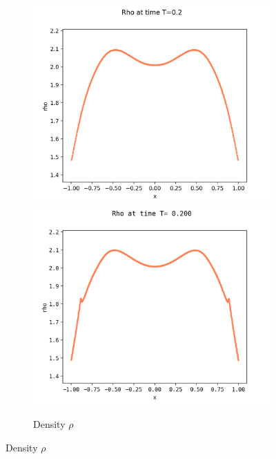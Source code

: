 \documentclass{article}
\numberwithin{equation}{section}
\newcommand{\imh}{\textheight} %
\newcommand{\imw}{\textwidth} %
\begin{document}
\begin{figure}
	\begin{subfigure}{\textwidth}
		\centering
		\includegraphics[height=\imh,width=\imw]{images/rhoT0p2_FD.png}
		\includegraphics[height=\imh,width=\imw]{images/rhoT0p2.png}
		\caption{Density $\rho$}
		\label{subfig:compT02_rho}
	\end{subfigure}
	

\end{figure}
\end{document}
